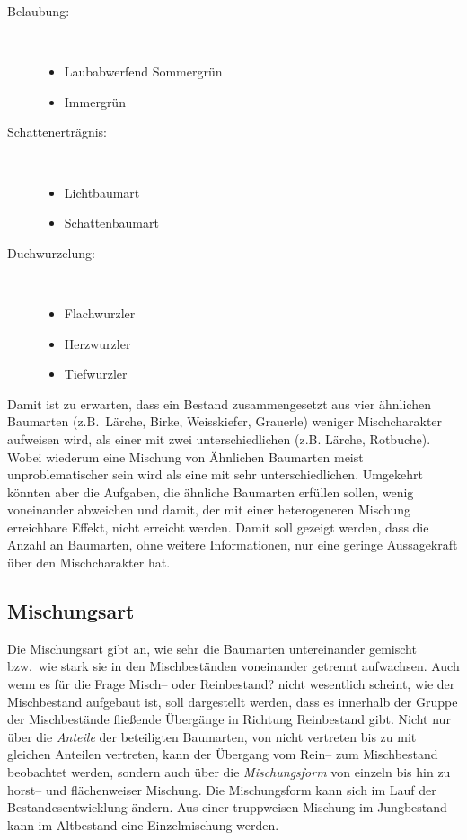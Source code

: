 \documentclass[twocolumn]{scrartcl}
\begin{document}
\begin{description}
  \item[Belaubung:] ~
  \begin{itemize}
    \item Laubabwerfend Sommergrün
    \item Immergrün
  \end{itemize}
  \item[Schattenerträgnis:] ~
  \begin{itemize}
    \item Lichtbaumart
    \item Schattenbaumart
  \end{itemize}
  \item[Duchwurzelung:] ~
  \begin{itemize}
    \item Flachwurzler
    \item Herzwurzler
    \item Tiefwurzler
  \end{itemize}
\end{description}

Damit ist zu erwarten, dass ein Bestand zusammengesetzt aus vier ähnlichen
Baumarten (z.B.\ Lärche, Birke, Weisskiefer, Grauerle) weniger Mischcharakter
aufweisen wird, als einer mit zwei unterschiedlichen (z.B. Lärche, Rotbuche).
Wobei wiederum eine Mischung von Ähnlichen Baumarten meist unproblematischer
sein wird als eine mit sehr unterschiedlichen. Umgekehrt könnten aber die
Aufgaben, die ähnliche Baumarten erfüllen sollen, wenig voneinander abweichen
und damit, der mit einer heterogeneren Mischung erreichbare Effekt, nicht
erreicht werden. Damit soll gezeigt werden, dass die Anzahl an Baumarten, ohne
weitere Informationen, nur eine geringe Aussagekraft über den Mischcharakter
hat.

\subsection{Mischungsart}
\label{ssec:mischugnsart}

Die Mischungsart gibt an, wie sehr die Baumarten untereinander gemischt bzw.\
wie stark sie in den Mischbeständen voneinander getrennt aufwachsen. Auch wenn
es für die Frage \glqq Misch-- oder Reinbestand?\grqq{} nicht wesentlich
scheint, wie der Mischbestand aufgebaut ist, soll dargestellt werden, dass es
innerhalb der Gruppe der Mischbestände fließende Übergänge in Richtung
Reinbestand gibt. Nicht nur über die \emph{Anteile} der beteiligten Baumarten,
von \glqq nicht vertreten\grqq{} bis zu \glqq mit gleichen Anteilen
vertreten\grqq{}, kann der Übergang vom Rein-- zum Mischbestand beobachtet
werden, sondern auch über die \emph{Mischungsform} von einzeln bis hin zu
horst-- und flächenweiser Mischung. Die Mischungsform kann sich im Lauf der
Bestandesentwicklung ändern. Aus einer truppweisen Mischung im Jungbestand kann
im Altbestand eine Einzelmischung werden.
\end{document}

